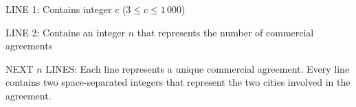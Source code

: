 LINE 1: Contains integer $c$ ($3 \le c \le 1\,000$)

LINE 2: Contains an integer $n$ that represents the number of
commercial agreements

NEXT $n$ LINES: Each line represents a unique commercial
agreement. Every line contains two space-separated integers
that represent the two cities involved in the agreement.
